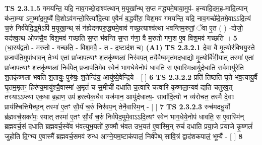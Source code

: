 \documentclass[17pt]{extarticle}
\begin{document}
                  \newline
                                \textbf{ TS 2.3.1.5} \newline
                  गमयन्ति॒ यदि॒ नाव॒गच्छे॒दाश्व॑त्थान् म॒यूखा᳚न्थ् स॒प्त म॑द्ध्यमे॒षाया॒मुप॑- हन्यादि॒दम॒ह-मा॑दि॒त्यान् ब॑ध्ना॒म्या ऽमुष्मा॑द॒मुष्यै॑ वि॒शोऽव॑गन्तो॒रित्या॑दि॒त्या ए॒वैनं॑ ब॒द्धवी॑रा॒ विश॒मव॑ गमयन्ति॒ यदि॒ नाव॒गच्छे॑दे॒तमे॒वाऽऽदि॒त्यं च॒रुं निर्व॑पेदि॒द्ध्मेऽपि॑ म॒यूखा॒न्थ् सं न॑ह्येदनपरु॒द्ध्यमे॒वाव॑ गच्छ॒त्याश्व॑त्था भवन्तिम॒रुतां॒ ॅवा ए॒त ( ) -दोजो॒ यद॑श्व॒त्थ ओज॑सै॒व विश॒मव॑ गच्छति स॒प्त भ॑वन्ति स॒प्त ग॑णा॒ वै म॒रुतो॑ गण॒श ए॒व विश॒मव॑ गच्छति । \textbf{  5 } \newline
                  \newline
                      (धा॒रय॑द्वतो - मरुतो - गच्छति॒ - विश॒मवै॒ - त - द॒ष्टाद॑श च)  \textbf{(A1)} \newline \newline
                                        \textbf{ TS 2.3.2.1} \newline
                  दे॒वा वै मृ॒त्योर॑बिभयु॒स्ते प्र॒जाप॑ति॒मुपा॑धाव॒न् तेभ्य॑ ए॒तां प्रा॑जाप॒त्याꣳ श॒तकृ॑ष्णलां॒ निर॑वप॒त् तयै॒वैष्व॒मृत॑मदधा॒द्यो मृ॒त्योर्बि॑भी॒यात् तस्मा॑ ए॒तां प्रा॑जाप॒त्याꣳ श॒तकृ॑ष्णलां॒ निर्व॑पेत् प्र॒जाप॑तिमे॒व स्वेन॑ भाग॒धेये॒नोप॑ धावति॒ स ए॒वास्मि॒न्नायु॑र्दधाति॒ सर्व॒मायु॑रेति श॒तकृ॑ष्णला भवति श॒तायुः॒ पुरु॑षः॒ श॒तेन्द्रि॑य॒ आयु॑ष्ये॒वेन्द्रि॒ये - [  ] \textbf{  6} \newline
                  \newline
                                \textbf{ TS 2.3.2.2} \newline
                  प्रति॑ तिष्ठति घृ॒ते भ॑व॒त्यायु॒र्वै घृ॒तम॒मृतꣳ॒॒ हिर॑ण्य॒मायु॑श्चै॒वास्मा॑ अ॒मृतं॑ च स॒मीची॑ दधाति च॒त्वारि॑ चत्वारि कृ॒ष्णला॒न्यव॑ द्यति चतुरव॒त् तस्याऽऽप्त्या॑ एक॒धा ब्र॒ह्मण॒ उप॑ हरत्येक॒धैव यज॑मान॒ आयु॑र्दधात्य॒- सावा॑दि॒त्यो न व्य॑रोचत॒ तस्मै॑ दे॒वाः प्राय॑श्चित्तिमैच्छ॒न् तस्मा॑ ए॒तꣳ सौ॒र्यं च॒रुं निर॑वप॒न् तेनै॒वास्मि॒न् - [  ] \textbf{  7} \newline
                  \newline
                                \textbf{ TS 2.3.2.3} \newline
                  रुच॑मदधु॒र्यो ब्र॑ह्मवर्च॒सका॑मः॒ स्यात् तस्मा॑ ए॒तꣳ सौ॒र्यं च॒रुं निर्व॑पेद॒मुमे॒वाऽऽदि॒त्यꣳ स्वेन॑ भाग॒धेये॒नोप॑ धावति॒ स ए॒वास्मि॑न् ब्रह्मवर्च॒सं द॑धाति ब्रह्मवर्च॒स्ये॑व भ॑वत्युभ॒यतो॑ रु॒क्मौ भ॑वत उभ॒यत॑ ए॒वास्मि॒न् रुचं॑ दधाति प्रया॒जे प्र॑याजे कृ॒ष्णलं॑ जुहोति दि॒ग्भ्य ए॒वास्मै᳚ ब्रह्मवर्च॒समव॑ रुन्ध आग्ने॒यम॒ष्टाक॑पालं॒ निर्व॑पेथ् सावि॒त्रं द्वाद॑शकपालं॒ भूम्यै॑ - [  ] \textbf{  8} \newline
\end{document}
